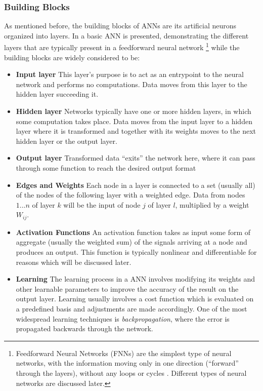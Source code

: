     \subsubsection{Building Blocks}

    As mentioned before, the building blocks of ANNs are its artificial
    neurons organized into layers. In   a basic
    ANN is presented, demonstrating the different layers that are typically
    present in a feedforward neural network \footnote{Feedforward Neural Networks
    (FNNs) are the simplest type of neural networks, with the information moving
    only in one direction (``forward'' through the layers), without any loops or
    cycles \cite{article:SCHMID}. Different types of neural networks are discussed
    later.} while the building blocks are widely considered \cite{article:SCHMID} to
    be:
    \begin{itemize}
    \item \textbf{Input layer} This layer's purpose is to act as an
    entrypoint to the neural network and performs no computations. Data moves from
    this layer to the hidden layer succeeding it.
    \item \textbf{Hidden layer} Networks typically have one or more
    hidden layers, in which some computation takes place. Data moves from the input
    layer to a hidden layer where it is transformed and together with its weights
    moves to the next hidden layer or the output layer.
    \item \textbf{Output layer} Transformed data ``exits'' the network here,
    where it can pass through some function to reach the desired output
    format
    \item \textbf{Edges and Weights} Each node in a layer is connected
    to a set (usually all) of the nodes of the following layer with a
    weighted edge. Data from nodes $1 ... n$ of layer $k$ will be the input
    of node $j$ of layer $l$, multiplied by a weight $W_{ij}$. 
    \item \textbf{Activation Functions} An activation function takes as
    input some form of aggregate (usually the weighted sum) of the signals
  arriving at a node and produces an output. This function is typically
  nonlinear and differentiable for reasons which will be discussed later.
\item \textbf{Learning} The learning process in a ANN involves modifying
  its weights and other learnable parameters to improve the accuracy
  of the result on the output layer. Learning usually involves a cost
  function which is evaluated on a predefined basis and adjustments are
  made accordingly. One of the most widespread learning techniques is
  \textit{backpropagation}, where the error is propagated backwards
  through the network.
  
\end{itemize}

